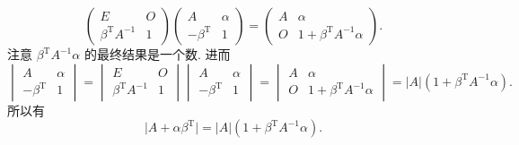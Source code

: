 \begin{exercise}
\begin{exgroup}
\begin{answer}
            \[\begin{pmatrix}
                    E                        & O \\
                    \beta^{\mathrm{T}}A^{-1} & 1
                \end{pmatrix} \begin{pmatrix}
                    A                   & \alpha \\
                    -\beta^{\mathrm{T}} & 1
                \end{pmatrix} = \begin{pmatrix}
                    A & \alpha                           \\
                    O & 1+\beta^{\mathrm{T}}A^{-1}\alpha
                \end{pmatrix}.\]
            注意 $\beta^{\mathrm{T}}A^{-1}\alpha$ 的最终结果是一个数. 进而
            \[\begin{vmatrix}
                    A                   & \alpha \\
                    -\beta^{\mathrm{T}} & 1
                \end{vmatrix} = \begin{vmatrix}
                    E                        & O \\
                    \beta^{\mathrm{T}}A^{-1} & 1
                \end{vmatrix} \begin{vmatrix}
                    A                   & \alpha \\
                    -\beta^{\mathrm{T}} & 1
                \end{vmatrix} = \begin{vmatrix}
                    A & \alpha                           \\
                    O & 1+\beta^{\mathrm{T}}A^{-1}\alpha
                \end{vmatrix} = \lvert A \rvert(1+\beta^{\mathrm{T}}A^{-1}\alpha).\]
            所以有
            \[\lvert A+\alpha \beta^{\mathrm{T}} \rvert = \lvert A \rvert(1+\beta^{\mathrm{T}}A^{-1}\alpha).\]
        \end{answer}


\end{exgroup}
\end{exercise}
